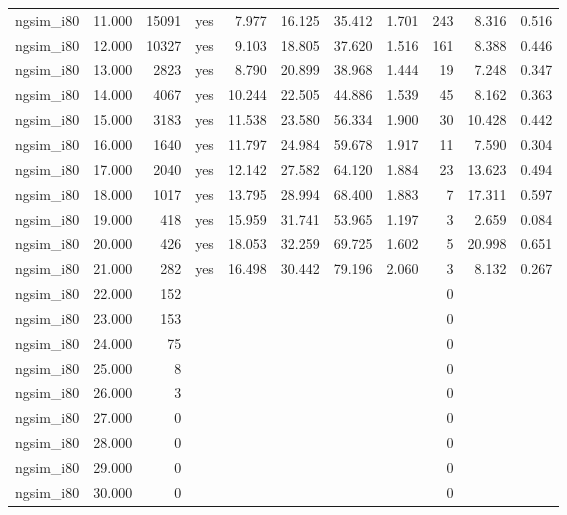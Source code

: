 \begin{table}[htbp]
{\begin{tabular}{lrrlrrrrrrr}
ngsim\_i80 & 11.000 & 15091 & yes & 7.977 & 16.125 & 35.412 & 1.701 & 243 & 8.316 & 0.516 \\
ngsim\_i80 & 12.000 & 10327 & yes & 9.103 & 18.805 & 37.620 & 1.516 & 161 & 8.388 & 0.446 \\
ngsim\_i80 & 13.000 & 2823 & yes & 8.790 & 20.899 & 38.968 & 1.444 & 19 & 7.248 & 0.347 \\
ngsim\_i80 & 14.000 & 4067 & yes & 10.244 & 22.505 & 44.886 & 1.539 & 45 & 8.162 & 0.363 \\
ngsim\_i80 & 15.000 & 3183 & yes & 11.538 & 23.580 & 56.334 & 1.900 & 30 & 10.428 & 0.442 \\
ngsim\_i80 & 16.000 & 1640 & yes & 11.797 & 24.984 & 59.678 & 1.917 & 11 & 7.590 & 0.304 \\
ngsim\_i80 & 17.000 & 2040 & yes & 12.142 & 27.582 & 64.120 & 1.884 & 23 & 13.623 & 0.494 \\
ngsim\_i80 & 18.000 & 1017 & yes & 13.795 & 28.994 & 68.400 & 1.883 & 7 & 17.311 & 0.597 \\
ngsim\_i80 & 19.000 & 418 & yes & 15.959 & 31.741 & 53.965 & 1.197 & 3 & 2.659 & 0.084 \\
ngsim\_i80 & 20.000 & 426 & yes & 18.053 & 32.259 & 69.725 & 1.602 & 5 & 20.998 & 0.651 \\
ngsim\_i80 & 21.000 & 282 & yes & 16.498 & 30.442 & 79.196 & 2.060 & 3 & 8.132 & 0.267 \\
ngsim\_i80 & 22.000 & 152 &  &  &  &  &  & 0 &  &  \\
ngsim\_i80 & 23.000 & 153 &  &  &  &  &  & 0 &  &  \\
ngsim\_i80 & 24.000 & 75 &  &  &  &  &  & 0 &  &  \\
ngsim\_i80 & 25.000 & 8 &  &  &  &  &  & 0 &  &  \\
ngsim\_i80 & 26.000 & 3 &  &  &  &  &  & 0 &  &  \\
ngsim\_i80 & 27.000 & 0 &  &  &  &  &  & 0 &  &  \\
ngsim\_i80 & 28.000 & 0 &  &  &  &  &  & 0 &  &  \\
ngsim\_i80 & 29.000 & 0 &  &  &  &  &  & 0 &  &  \\
ngsim\_i80 & 30.000 & 0 &  &  &  &  &  & 0 &  &  \\
\bottomrule
\end{tabular}
}
\end{table}

